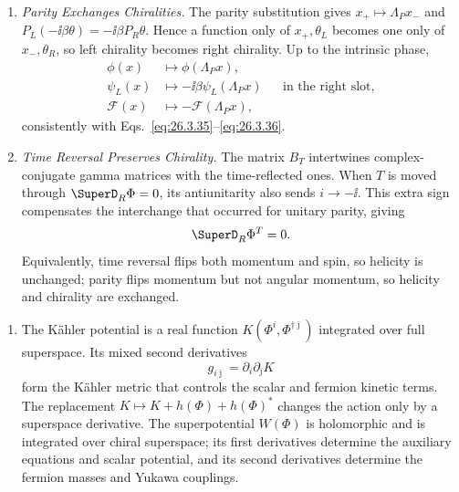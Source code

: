 \begin{enumerate}
  \begin{enumerate}
    \item \emph{Parity Exchanges Chiralities.}
    The parity substitution gives
      \(x_+\mapsto\Lambda_Px_-\) and
      \(P_L(-\ii\beta\theta)=-\ii\beta P_R\theta\).  Hence a function only of
      \(x_+,\theta_L\) becomes one only of \(x_-,\theta_R\), so left chirality
      becomes right chirality.  Up to the intrinsic phase,
      \[
        \begin{aligned}
          \phi(x)&\mapsto\phi(\Lambda_Px),\\
          \psi_L(x)&\mapsto-\ii\beta\psi_L(\Lambda_Px)
            &&\text{in the right slot},\\
          \mathcal F(x)&\mapsto-\mathcal F(\Lambda_Px),
        \end{aligned}
      \]
      consistently with Eqs.~\eqref{eq:26.3.35}--\eqref{eq:26.3.36}.
    \item \emph{Time Reversal Preserves Chirality.}
    The matrix \(B_T\) intertwines complex-conjugate gamma matrices with the
      time-reflected ones.  When \(T\) is moved through
      \(\SuperD_R\Phi=0\), its antiunitarity also sends \(i\to-\ii\).  This
      extra sign compensates the interchange that occurred for unitary parity,
      giving
      \[
        \SuperD_R\Phi^T=0.
      \]
      Equivalently, time reversal flips both momentum and spin, so helicity is
      unchanged; parity flips momentum but not angular momentum, so helicity
      and chirality are exchanged.
  \end{enumerate}

  \begin{enumerate}
    \item[(a)] The K\"ahler potential is a real function
    \(K(\Phi^i,\Phi^{\dagger\bar\jmath})\) integrated over full superspace.
    Its mixed second derivatives
    \[
      g_{i\bar\jmath}=\partial_i\partial_{\bar\jmath}K
    \]
    form the K\"ahler metric that controls the scalar and fermion kinetic
    terms.  The replacement
    \(K\mapsto K+h(\Phi)+h(\Phi)^*\) changes the action only by a superspace
    derivative.  The superpotential \(W(\Phi)\) is holomorphic and is
    integrated over chiral superspace; its first derivatives determine the
    auxiliary equations and scalar potential, and its second derivatives
    determine the fermion masses and Yukawa couplings.


\end{enumerate}
\end{enumerate}
